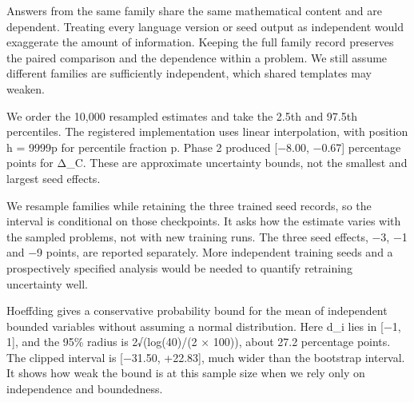 \medskip{}\par\nopagebreak

Answers from the same family share the same mathematical content and are dependent. Treating every language version or seed output as independent would exaggerate the amount of information. Keeping the full family record preserves the paired comparison and the dependence within a problem. We still assume different families are sufficiently independent, which shared templates may weaken.

\medskip{}\par\nopagebreak

We order the 10,000 resampled estimates and take the 2.5th and 97.5th percentiles. The registered implementation uses linear interpolation, with position h = 9999p for percentile fraction p. Phase 2 produced [−8.00, −0.67] percentage points for Δ\_C. These are approximate uncertainty bounds, not the smallest and largest seed effects.

\medskip{}\par\nopagebreak

We resample families while retaining the three trained seed records, so the interval is conditional on those checkpoints. It asks how the estimate varies with the sampled problems, not with new training runs. The three seed effects, −3, −1 and −9 points, are reported separately. More independent training seeds and a prospectively specified analysis would be needed to quantify retraining uncertainty well.

\medskip{}\par\nopagebreak

Hoeffding gives a conservative probability bound for the mean of independent bounded variables without assuming a normal distribution. Here d\_i lies in [−1, 1], and the 95\% radius is 2√(log(40)/(2 × 100)), about 27.2 percentage points. The clipped interval is [−31.50, +22.83], much wider than the bootstrap interval. It shows how weak the bound is at this sample size when we rely only on independence and boundedness.

\medskip{}\par\nopagebreak

